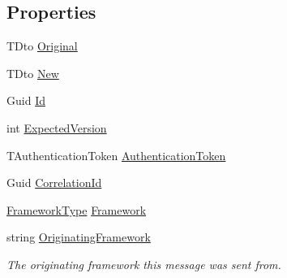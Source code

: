 \subsection*{Properties}
\begin{DoxyCompactItemize}
\item 
T\+Dto \hyperlink{classCqrs_1_1Commands_1_1DtoCommand_a67471c7e64228ee832343be7b89aa708_a67471c7e64228ee832343be7b89aa708}{Original}
\item 
T\+Dto \hyperlink{classCqrs_1_1Commands_1_1DtoCommand_a9664c5705a6de37478bdb627590363e5_a9664c5705a6de37478bdb627590363e5}{New}
\item 
Guid \hyperlink{classCqrs_1_1Commands_1_1DtoCommand_a14212f77b9341f240f77efa6d6adf211_a14212f77b9341f240f77efa6d6adf211}{Id}
\item 
int \hyperlink{classCqrs_1_1Commands_1_1DtoCommand_a9429ca1b2c6576c36d46912a18e5dc18_a9429ca1b2c6576c36d46912a18e5dc18}{Expected\+Version}
\item 
T\+Authentication\+Token \hyperlink{classCqrs_1_1Commands_1_1DtoCommand_aedf535bfbf04e3532c90e69548b85c32_aedf535bfbf04e3532c90e69548b85c32}{Authentication\+Token}
\item 
Guid \hyperlink{classCqrs_1_1Commands_1_1DtoCommand_aeb60eb40f2a201fd63e846d728768cdf_aeb60eb40f2a201fd63e846d728768cdf}{Correlation\+Id}
\item 
\hyperlink{namespaceCqrs_1_1Messages_af06a7e6cd2609043d0f2f5f3419f81e3_af06a7e6cd2609043d0f2f5f3419f81e3}{Framework\+Type} \hyperlink{classCqrs_1_1Commands_1_1DtoCommand_aef8db1c8e62c27c09abd1590f05bfba1_aef8db1c8e62c27c09abd1590f05bfba1}{Framework}
\item 
string \hyperlink{classCqrs_1_1Commands_1_1DtoCommand_a7272fbc4acb35942a1c5fb22cd3a6b9b_a7272fbc4acb35942a1c5fb22cd3a6b9b}{Originating\+Framework}
\begin{DoxyCompactList}\small\item\em The originating framework this message was sent from. \end{DoxyCompactList}\item 

\end{DoxyCompactItemize}
